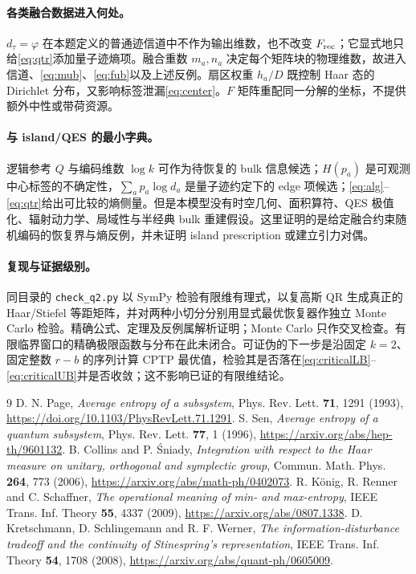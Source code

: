\documentclass[UTF8,a4paper,11pt]{ctexart}
\newcommand{\ph}{\varphi}
\begin{document}
\paragraph{各类融合数据进入何处。}
$d_\tau=\ph$ 在本题定义的普通迹信道中不作为输出维数，也不改变 $F_{\rm rec}$；它显式地只给\eqref{eq:qtr}添加量子迹熵项。融合重数 $m_a,n_a$ 决定每个矩阵块的物理维数，故进入信道、\eqref{eq:mub}、\eqref{eq:fub}以及上述反例。扇区权重 $h_a/D$ 既控制 Haar 态的 Dirichlet 分布，又影响标签泄漏\eqref{eq:center}。$F$ 矩阵重配同一分解的坐标，不提供额外中性或带荷资源。

\paragraph{与 island/QES 的最小字典。}
逻辑参考 $Q$ 与编码维数 $\log k$ 可作为待恢复的 bulk 信息候选；$H(p_a)$ 是可观测中心标签的不确定性，$\sum_a p_a\log d_a$ 是量子迹约定下的 edge 项候选；\eqref{eq:alg}--\eqref{eq:qtr}给出可比较的熵侧量。但是本模型没有时空几何、面积算符、QES 极值化、辐射动力学、局域性与半经典 bulk 重建假设。这里证明的是给定融合约束随机编码的恢复界与熵反例，并未证明 island prescription 或建立引力对偶。

\paragraph{复现与证据级别。}
同目录的 \texttt{check\_q2.py} 以 SymPy 检验有限维有理式，以复高斯 QR 生成真正的 Haar/Stiefel 等距矩阵，并对两种小切分分别用显式最优恢复器作独立 Monte Carlo 检验。精确公式、定理及反例属解析证明；Monte Carlo 只作交叉检查。有限临界窗口的精确极限函数与分布在此未闭合。可证伪的下一步是沿固定 $k=2$、固定整数 $r-b$ 的序列计算 CPTP 最优值，检验其是否落在\eqref{eq:criticalLB}--\eqref{eq:criticalUB}并是否收敛；这不影响已证的有限维结论。

\clearpage
\begin{thebibliography}{9}
 D. N. Page, \emph{Average entropy of a subsystem}, Phys. Rev. Lett. \textbf{71}, 1291 (1993), \url{https://doi.org/10.1103/PhysRevLett.71.1291}.
 S. Sen, \emph{Average entropy of a quantum subsystem}, Phys. Rev. Lett. \textbf{77}, 1 (1996), \url{https://arxiv.org/abs/hep-th/9601132}.
 B. Collins and P. Śniady, \emph{Integration with respect to the Haar measure on unitary, orthogonal and symplectic group}, Commun. Math. Phys. \textbf{264}, 773 (2006), \url{https://arxiv.org/abs/math-ph/0402073}.
 R. König, R. Renner and C. Schaffner, \emph{The operational meaning of min- and max-entropy}, IEEE Trans. Inf. Theory \textbf{55}, 4337 (2009), \url{https://arxiv.org/abs/0807.1338}.
 D. Kretschmann, D. Schlingemann and R. F. Werner, \emph{The information-disturbance tradeoff and the continuity of Stinespring's representation}, IEEE Trans. Inf. Theory \textbf{54}, 1708 (2008), \url{https://arxiv.org/abs/quant-ph/0605009}.
\end{thebibliography}
\end{document}
